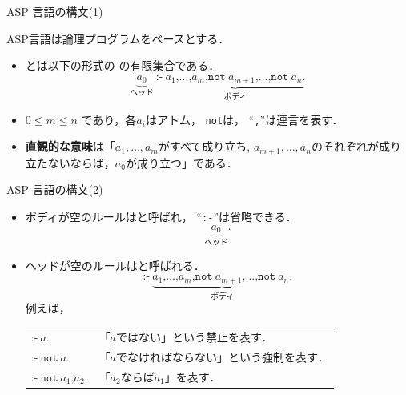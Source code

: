 \documentclass[dvipdfmx]{beamer}
\begin{document}
\begin{frame}{ASP 言語の構文(1)}
  \begin{alertblock}{}\centering
    ASP言語は論理プログラムをベースとする\footnotemark[1]．
  \end{alertblock}
\begin{itemize}
\item {}とは以下の形式の
  の有限集合である．
  \[
    \underbrace{a_0}_{\textrm{ヘッド}}\ \texttt{:-}\
    \underbrace{a_1\texttt{,}\dots\texttt{,}a_m\texttt{,}
      \texttt{not}\ {a_{m+1}}\texttt{,}\dots\texttt{,}
      \texttt{not}\ {a_n}\texttt{.}}_{\textrm{ボディ}}
  \]
\item $0\leq m\leq n$ であり，各$a_i$はアトム，
  \texttt{not}は，
  ``\texttt{,}''は連言を表す．
\item \alert{\bf 直観的な意味}は「$a_1,\ldots,a_m$がすべて成り立ち,
  $a_{m+1},\ldots,a_n$のそれぞれが成り立たないならば，$a_0$が成り立つ」である．
\end{itemize}
\end{frame}
\begin{frame}{ASP 言語の構文(2)}

\begin{itemize}
\item ボディが空のルールはと呼ばれ，
  ``\texttt{:-}''は省略できる．
  \[
    \underbrace{a_0}_{\textrm{ヘッド}}\texttt{.}
  \]
\item ヘッドが空のルールはと呼ばれる．
  \[
    \texttt{:-}\
    \underbrace{a_1\texttt{,}\dots\texttt{,}a_m\texttt{,}
      \texttt{not}\ {a_{m+1}}\texttt{,}\dots\texttt{,}
      \texttt{not}\ {a_n}\texttt{.}}_{\textrm{ボディ}}
  \]
  例えば，\\[1em]
  \begin{tabular}[t]{l|l}
    \(\texttt{:-}\ a\texttt{.}\) &
   「$a$ではない」という禁止を表す．\\
    \(\texttt{:-}\ \texttt{not}\ a\texttt{.}\) &
   「$a$でなければならない」という強制を表す．\\
    \(\texttt{:-}\ \texttt{not}\ a_1\texttt{,} {a_{2}}\texttt{.}\)&
  「$a_2$ならば$a_1$」を表す．
  \end{tabular}
\end{itemize}
\end{frame}
\end{document}
